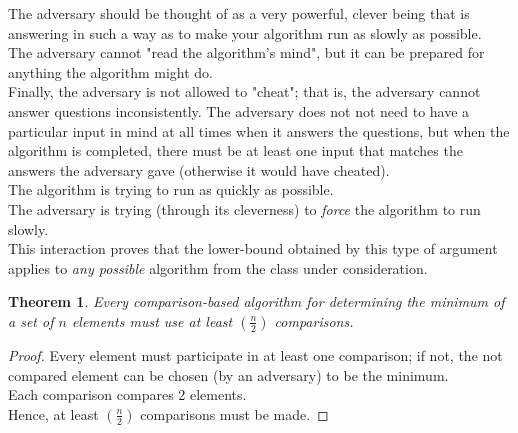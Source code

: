 \documentclass[12pt]{article}
\theoremstyle{plain}
\newtheorem{theorem}{Theorem}[subsection]
\theoremstyle{definition}
\begin{document}
The adversary should be thought of as a very powerful, clever being that is answering in such a way as to make your algorithm run as slowly as possible. \\
The adversary cannot "read the algorithm's mind", but it can be prepared for anything the algorithm might do. \\
Finally, the adversary is not allowed to "cheat";
that is, the adversary cannot answer questions inconsistently.
The adversary does not not need to have a particular input in mind at all times when it answers the questions, but when the algorithm is completed, there must be at least one input that matches the answers the adversary gave (otherwise it would have cheated). \\

The algorithm is trying to run as quickly as possible. \\
The adversary is trying (through its cleverness) to \emph{force} the algorithm to run slowly. \\
This interaction proves that the lower-bound obtained by this type of argument applies to \emph{any possible} algorithm from the class under consideration. \\

\begin{theorem}
Every comparison-based algorithm for determining the minimum of a set of $n$ elements must use at least $(\frac{n}{2})$ comparisons.
\end{theorem}
\begin{proof}
Every element must participate in at least one comparison;
if not, the not compared element can be chosen (by an adversary) to be the minimum. \\
Each comparison compares 2 elements. \\
Hence, at least $(\frac{n}{2})$ comparisons must be made.
\end{proof}
\end{document}
